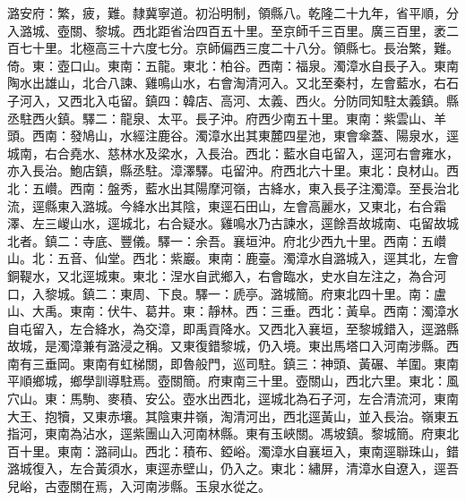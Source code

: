 \begin{pinyinscope}
潞安府：繁，疲，難。隸冀寧道。初沿明制，領縣八。乾隆二十九年，省平順，分入潞城、壺關、黎城。西北距省治四百五十里。至京師千三百里。廣三百里，袤二百七十里。北極高三十六度七分。京師偏西三度二十八分。領縣七。長治繁，難。倚。東：壺口山。東南：五龍。東北：柏谷。西南：福泉。濁漳水自長子入。東南陶水出雄山，北合八諫、雞鳴山水，右會淘清河入。又北至秦村，左會藍水，右石子河入，又西北入屯留。鎮四：韓店、高河、太義、西火。分防同知駐太義鎮。縣丞駐西火鎮。驛二：龍泉、太平。長子沖。府西少南五十里。東南：紫雲山、羊頭。西南：發鳩山，水經注鹿谷。濁漳水出其東麓四星池，東會傘蓋、陽泉水，逕城南，右合堯水、慈林水及梁水，入長治。西北：藍水自屯留入，逕河右會雍水，亦入長治。鮑店鎮，縣丞駐。漳澤驛。屯留沖。府西北六十里。東北：良材山。西北：五巑。西南：盤秀，藍水出其陽摩河嶺，古絳水，東入長子注濁漳。至長治北流，逕縣東入潞城。今絳水出其陰，東逕石田山，左會高麗水，又東北，右合霜澤、左三嵕山水，逕城北，右合疑水。雞鳴水乃古諫水，逕餘吾故城南、屯留故城北者。鎮二：寺底、豐儀。驛一：余吾。襄垣沖。府北少西九十里。西南：五巑山。北：五音、仙堂。西北：紫巖。東南：鹿臺。濁漳水自潞城入，逕其北，左會銅鞮水，又北逕城東。東北：涅水自武鄉入，右會臨水，史水自左注之，為合河口，入黎城。鎮二：東周、下良。驛一：虒亭。潞城簡。府東北四十里。南：盧山、大禹。東南：伏牛、葛井。東：靜林。西：三垂。西北：黃阜。西南：濁漳水自屯留入，左合絳水，為交漳，即禹貢降水。又西北入襄垣，至黎城錯入，逕潞縣故城，是濁漳兼有潞浸之稱。又東復錯黎城，仍入境。東出馬塔口入河南涉縣。西南有三垂岡。東南有虹梯關，即魯般門，巡司駐。鎮三：神頭、黃碾、羊圍。東南平順鄉城，鄉學訓導駐焉。壺關簡。府東南三十里。壺關山，西北六里。東北：風穴山。東：馬駒、麥積、安公。壺水出西北，逕城北為石子河，左合清流河，東南大王、抱犢，又東赤壤。其陰東井嶺，淘清河出，西北逕黃山，並入長治。嶺東五指河，東南為沾水，逕紫團山入河南林縣。東有玉峽關。馮坡鎮。黎城簡。府東北百十里。東南：潞祠山。西北：積布、錏峪。濁漳水自襄垣入，東南逕聯珠山，錯潞城復入，左合黃須水，東逕赤壁山，仍入之。東北：繡屏，清漳水自遼入，逕吾兒峪，古壺關在焉，入河南涉縣。玉泉水從之。


\end{pinyinscope}
